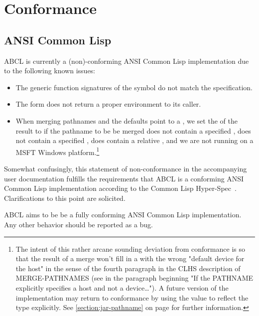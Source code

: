 \documentclass[10pt]{book}
\begin{document}
\section{Conformance}
\label{section:conformance}

\subsection{ANSI Common Lisp}
\textsc{ABCL} is currently a (non)-conforming \textsc{ANSI} Common Lisp
implementation due to the following known issues:

\begin{itemize}
\item The generic function signatures of the 
  symbol do not match the specification.
\item The  form does not return a proper
   environment to its caller.
\item When merging pathnames and the defaults point to a
  , we set the  of the result to
   if the pathname to be be merged does not contain
  a specified , does not contain a specified ,
  does contain a relative , and we are not running on
  a \textsc{MSFT} Windows platform.\footnote{The intent of this rather
  arcane sounding deviation from conformance is so that the result of
  a merge won't fill in a  with the wrong "default device
  for the host" in the sense of the fourth paragraph in the
  \textsc{CLHS} description of MERGE-PATHNAMES (see in \cite{CLHS} the
  paragraph beginning "If the PATHNAME explicitly specifies a host and
  not a device…").  A future version of the implementation may return
  to conformance by using the  value to reflect the type
  explicitly. See \ref{section:jar-pathname} on page
  \pageref{section:jar-pathname} for further information.}

\end{itemize}

Somewhat confusingly, this statement of non-conformance in the
accompanying user documentation fulfills the requirements that
\textsc{ABCL} is a conforming ANSI Common Lisp implementation according
to the Common Lisp Hyper-Spec~\cite{CLHS}.  Clarifications to this point
are solicited.

\textsc{ABCL} aims to be be a fully conforming \textsc{ANSI} Common
Lisp implementation.  Any other behavior should be reported as a bug.
\end{document}
